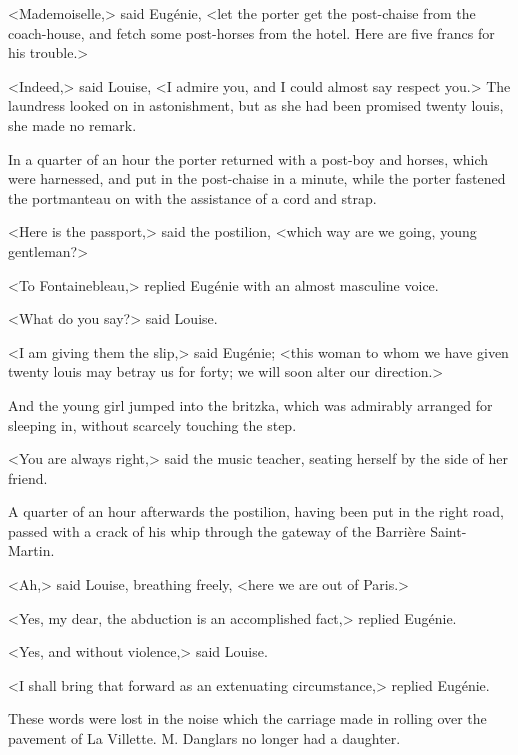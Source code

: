 <Mademoiselle,> said Eugénie, <let the porter get the post-chaise from the coach-house, and fetch some post-horses from the hotel. Here are five francs for his trouble.> 

 <Indeed,> said Louise, <I admire you, and I could almost say respect you.> The laundress looked on in astonishment, but as she had been promised twenty louis, she made no remark. 

 In a quarter of an hour the porter returned with a post-boy and horses, which were harnessed, and put in the post-chaise in a minute, while the porter fastened the portmanteau on with the assistance of a cord and strap. 

 <Here is the passport,> said the postilion, <which way are we going, young gentleman?> 

 <To Fontainebleau,> replied Eugénie with an almost masculine voice. 

 <What do you say?> said Louise. 

 <I am giving them the slip,> said Eugénie; <this woman to whom we have given twenty louis may betray us for forty; we will soon alter our direction.> 

 And the young girl jumped into the britzka, which was admirably arranged for sleeping in, without scarcely touching the step. 

 <You are always right,> said the music teacher, seating herself by the side of her friend. 

 A quarter of an hour afterwards the postilion, having been put in the right road, passed with a crack of his whip through the gateway of the Barrière Saint-Martin. 

 <Ah,> said Louise, breathing freely, <here we are out of Paris.> 

 <Yes, my dear, the abduction is an accomplished fact,> replied Eugénie. 

 <Yes, and without violence,> said Louise. 

 <I shall bring that forward as an extenuating circumstance,> replied Eugénie. 

 These words were lost in the noise which the carriage made in rolling over the pavement of La Villette. M. Danglars no longer had a daughter. 
